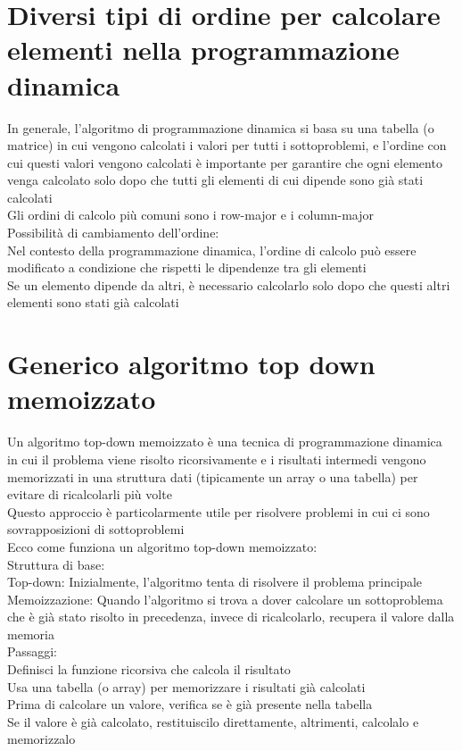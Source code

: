 \documentclass[12pt,oneside,a4paper]{article}
\begin{document}
\section{Diversi tipi di ordine per calcolare elementi nella programmazione dinamica}
In generale, l'algoritmo di programmazione dinamica si basa su una tabella (o matrice) in cui vengono calcolati i valori per tutti i sottoproblemi, e l'ordine con cui questi valori vengono calcolati è importante per garantire che ogni elemento venga calcolato solo dopo che tutti gli elementi di cui dipende sono già stati calcolati\\
Gli ordini di calcolo più comuni sono i row-major e i column-major\\
Possibilità di cambiamento dell'ordine:\\
Nel contesto della programmazione dinamica, l'ordine di calcolo può essere modificato a condizione che rispetti le dipendenze tra gli elementi\\
Se un elemento dipende da altri, è necessario calcolarlo solo dopo che questi altri elementi sono stati già calcolati
\section{Generico algoritmo top down memoizzato}
Un algoritmo top-down memoizzato è una tecnica di programmazione dinamica in cui il problema viene risolto ricorsivamente e i risultati intermedi vengono memorizzati in una struttura dati (tipicamente un array o una tabella) per evitare di ricalcolarli più volte\\
Questo approccio è particolarmente utile per risolvere problemi in cui ci sono sovrapposizioni di sottoproblemi\\
Ecco come funziona un algoritmo top-down memoizzato:\\
Struttura di base:\\
Top-down: Inizialmente, l'algoritmo tenta di risolvere il problema principale\\
Memoizzazione: Quando l'algoritmo si trova a dover calcolare un sottoproblema che è già stato risolto in precedenza, invece di ricalcolarlo, recupera il valore dalla memoria\\
Passaggi:\\
Definisci la funzione ricorsiva che calcola il risultato\\
Usa una tabella (o array) per memorizzare i risultati già calcolati\\
Prima di calcolare un valore, verifica se è già presente nella tabella\\
Se il valore è già calcolato, restituiscilo direttamente, altrimenti, calcolalo e memorizzalo
\end{document}
